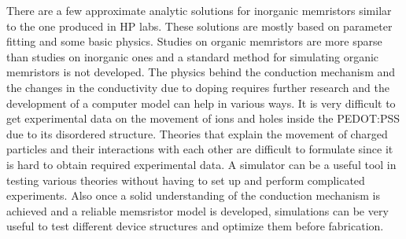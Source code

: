 \begin{doublespace}
There are a few approximate analytic solutions for inorganic memristors similar to the one produced in HP labs. These solutions are mostly based on parameter fitting and some basic physics. Studies on organic memristors are more sparse than studies on inorganic ones and a standard method for simulating organic memristors is not developed. The physics behind the conduction mechanism and the changes in the conductivity due to doping requires further research and the development of a computer model can help in various ways. It is very difficult to get experimental data on the movement of ions and holes inside the PEDOT:PSS due to its disordered structure. Theories that explain the movement of charged particles and their interactions with each other are difficult to formulate since it is hard to obtain required experimental data. A simulator can be a useful tool in testing various theories without having to set up and perform complicated experiments. Also once a solid understanding of the conduction mechanism is achieved and a reliable memsristor model is developed, simulations can be very useful to test different device structures and optimize them before fabrication. 


 \end{doublespace}